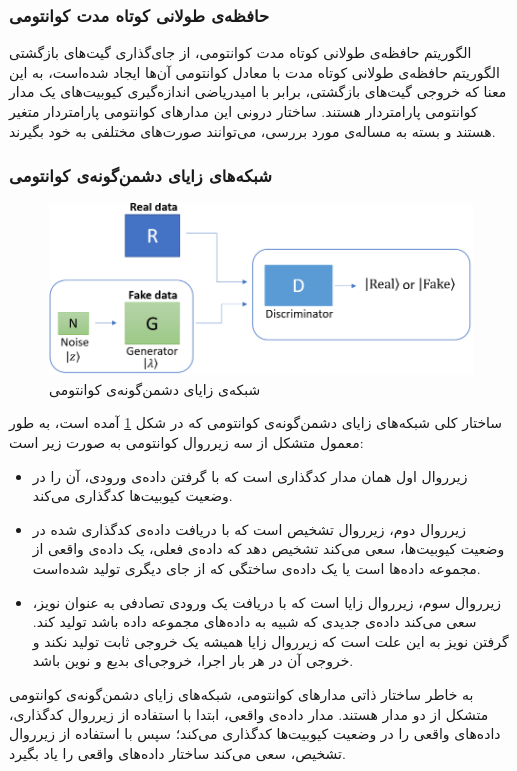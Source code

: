 \subsubsection{حافظه‌ی طولانی کوتاه مدت کوانتومی} \label{sec:qlstm}
الگوریتم حافظه‌ی طولانی کوتاه مدت کوانتومی، از جای‌گذاری گیت‌های بازگشتی الگوریتم حافظه‌ی طولانی کوتاه مدت با معادل کوانتومی آن‌ها ایجاد شده‌است، به این معنا که خروجی گیت‌های بازگشتی، برابر با امیدریاضی اندازه‌گیری کیوبیت‌های یک مدار کوانتومی پارامتردار هستند. 
ساختار درونی این مدارهای کوانتومی پارامتردار متغیر هستند و بسته به مساله‌ی مورد بررسی، می‌توانند صورت‌های مختلفی به خود بگیرند.

\subsubsection{شبکه‌های زایای دشمن‌گونه‌ی کوانتومی} \label{sec:qugan}

\begin{figure}
	\centering
	\includegraphics[scale=0.4]{figures/qugan.png}
	\caption{شبکه‌ی زایای دشمن‌گونه‌ی کوانتومی}
	\label{fig:qugan}
\end{figure}

ساختار کلی شبکه‌های زایای دشمن‌گونه‌ی کوانتومی که در شکل 
\ref{fig:qugan}
آمده است، به طور معمول متشکل از سه زیرروال کوانتومی به صورت زیر است:
\begin{itemize}
    \item زیرروال اول همان مدار کدگذاری است که با گرفتن داده‌ی ورودی، آن را در وضعیت کیوبیت‌ها کدگذاری می‌کند.
    \item زیرروال دوم، زیرروال تشخیص است که با دریافت داده‌ی کدگذاری شده در وضعیت کیوبیت‌ها، سعی می‌کند تشخیص دهد که داده‌ی فعلی، یک داده‌ی واقعی از مجموعه داده‌ها است یا یک داده‌ی ساختگی که از جای دیگری تولید شده‌است.
    \item زیرروال سوم، زیرروال زایا است که با دریافت یک ورودی تصادفی به عنوان نویز، سعی می‌کند داده‌ی جدیدی که شبیه به داده‌های مجموعه داده باشد تولید کند. گرفتن نویز به این علت است که زیرروال زایا همیشه یک خروجی ثابت تولید نکند و خروجی آن در هر بار اجرا، خروجی‌ای بدیع و نوین باشد.
\end{itemize}
به خاطر ساختار ذاتی مدارهای کوانتومی، شبکه‌های زایای دشمن‌گونه‌ی کوانتومی متشکل از دو مدار هستند.
مدار داده‌ی واقعی، ابتدا با استفاده از زیرروال کدگذاری، داده‌های واقعی را در وضعیت کیوبیت‌ها کدگذاری می‌کند؛ سپس با استفاده از زیرروال تشخیص، سعی می‌کند ساختار داده‌های واقعی را یاد بگیرد.

